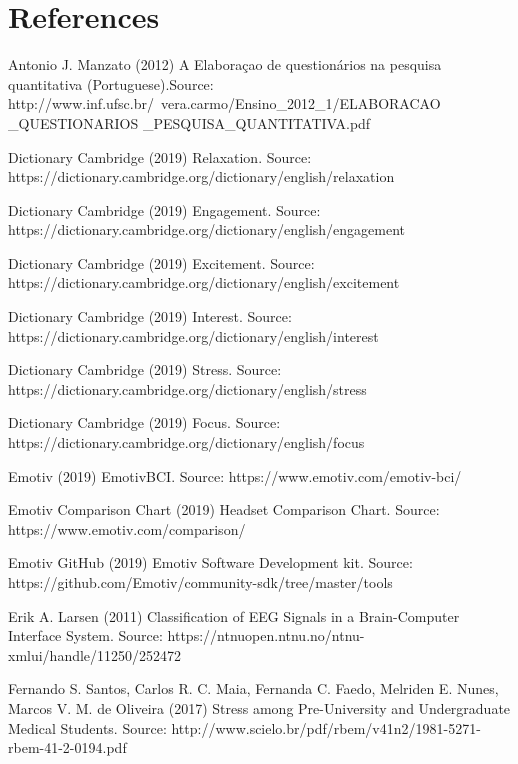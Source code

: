 \documentclass[12pt,openright,a4paper]{article}
\begin{document}
\newpage
\section{References}

  Antonio J. Manzato (2012) A Elaboraçao de questionários na pesquisa quantitativa (Portuguese).Source: http://www.inf.ufsc.br/~vera.carmo/Ensino\_2012\_1/ELABORACAO\\ \_QUESTIONARIOS \_PESQUISA\_QUANTITATIVA.pdf\newline
   
  Dictionary Cambridge (2019) Relaxation. Source: https://dictionary.cambridge.org/dictionary/english/relaxation\newline
  
  Dictionary Cambridge (2019) Engagement. Source: https://dictionary.cambridge.org/dictionary/english/engagement\newline
   
  Dictionary Cambridge (2019) Excitement. Source: https://dictionary.cambridge.org/dictionary/english/excitement\newline
   
  Dictionary Cambridge (2019) Interest. Source: https://dictionary.cambridge.org/dictionary/english/interest\newline
  
  Dictionary Cambridge (2019) Stress. Source: https://dictionary.cambridge.org/dictionary/english/stress\newline
  
  Dictionary Cambridge (2019) Focus. Source: https://dictionary.cambridge.org/dictionary/english/focus\newline
  
  Emotiv (2019) EmotivBCI. Source: https://www.emotiv.com/emotiv-bci/ \newline
  
  Emotiv Comparison Chart (2019) Headset Comparison Chart. Source: https://www.emotiv.com/comparison/ \newline
  
  Emotiv GitHub (2019) Emotiv Software Development kit. Source: https://github.com/Emotiv/community-sdk/tree/master/tools \newline
  
  Erik A. Larsen (2011) Classification of EEG Signals in a Brain-Computer Interface System. Source: https://ntnuopen.ntnu.no/ntnu-xmlui/handle/11250/252472 \newline
  
  Fernando S. Santos, Carlos R. C. Maia, Fernanda C. Faedo, Melriden E. Nunes, Marcos V. M. de Oliveira (2017) Stress among Pre-University and Undergraduate
  Medical Students. Source: http://www.scielo.br/pdf/rbem/v41n2/1981-5271-rbem-41-2-0194.pdf \newline
  
\end{document}
